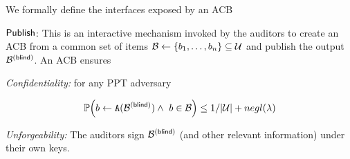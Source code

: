 We formally define the interfaces exposed by an ACB

\itemListStart
\item $\mathsf{Publish}$: This is an interactive mechanism invoked by the auditors to create an ACB from a common set of items $\blocklist \assign \{\genericBlocklistElmt_1, \dots, \genericBlocklistElmt_\blocklistSize \} \subseteq \universe$ and publish the output $\blindedBlocklist$. An ACB ensures 

\itemListStart

\item \emph{Confidentiality:} for any PPT adversary \adversary 


\[
\prob{\genericBlocklistElmt \assign  \adversary(\blindedBlocklist) \land ~\genericBlocklistElmt \in \blocklist} \le 1/|\universe| + \neglProb 
\]
%


\item \emph{Unforgeability:} The auditors sign $\blindedBlocklist$ (and other relevant information) under their own keys.  

